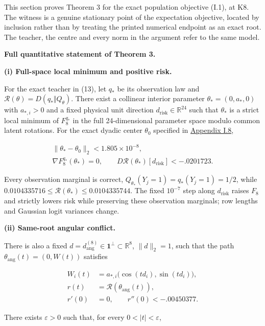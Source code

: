 \documentclass{article}
\begin{document}
This section proves Theorem 3 for the exact population objective (I.1),
at K8. The witness is a genuine stationary point of the expectation
objective, located by inclusion rather than by treating the printed
numerical endpoint as an exact root. The teacher, the centre and every
norm in the argument refer to the same model.

\protect{}\label{full-local-statement}
\textbf{Full quantitative statement of Theorem 3.}

\textbf{(i) Full-space local minimum and positive risk.}

For the exact teacher in (13), let \(q_*\) be its observation law and
\(\mathcal R(\theta)=D(q_*\Vert Q_\theta)\). There exist a collinear
interior parameter \(\theta_*=(0,a_*,0)\) with \(a_{*,i}>0\) and a fixed
physical unit direction \(d_{\mathrm{risk}}\in\mathbb R^{24}\) such that
\(\theta_*\) is a strict local minimum of \(F_8^{q_*}\) in the full
24-dimensional parameter space modulo common latent rotations. For the
exact dyadic center \(\theta_0\) specified in
\hyperref[proof-theorem-3]{Appendix I.8},

\[
\begin{gathered}
\|\theta_*-\theta_0\|_2<1.805\times10^{-8},\\
\nabla F_8^{q_*}(\theta_*)=0,\qquad
D\mathcal R(\theta_*)[d_{\mathrm{risk}}]<-.0201723.
\end{gathered}
\]

Every observation marginal is correct,
\(Q_{\theta_*}(Y_j=1)=q_*(Y_j=1)=1/2\), while
\(0.0104335716\le\mathcal R(\theta_*)\le0.0104335744\). The fixed
\(10^{-7}\) step along \(d_{\mathrm{risk}}\) raises \(F_8\) and strictly
lowers risk while preserving these observation marginals; row lengths
and Gaussian logit variances change.


\textbf{(ii) Same-root angular conflict.}

There is also a fixed
\(d=d_{\mathrm{ang}}^{(8)}\in\mathbf1^\perp\subset\mathbb R^8\),
\(\|d\|_2=1\), such that the path \(\theta_{\mathrm{ang}}(t)=(0,W(t))\)
satisfies

\[
\begin{aligned}
W_i(t)&=a_{*,i}\bigl(\cos(td_i),\sin(td_i)\bigr),\\
r(t)&=\mathcal R(\theta_{\mathrm{ang}}(t)),\\
r'(0)&=0,\qquad r''(0)<-.00450377.
\end{aligned}
\]

There exists \(\varepsilon>0\) such that, for every
\(0<|t|<\varepsilon\),
\end{document}
